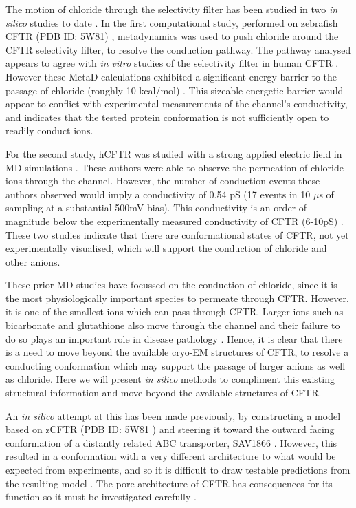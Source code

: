 The motion of chloride through the selectivity filter has been studied in two \textit{in silico} studies to date \cite{farkas2020, zeng2021}. In the first computational study, performed on zebrafish CFTR (PDB ID: 5W81) \cite{zhang2017a}, metadynamics was used to push chloride around the CFTR selectivity filter, to resolve the conduction pathway. The pathway analysed appears to agree with \textit{in vitro} studies of the selectivity filter in human CFTR \cite{linsdell2016}. However these MetaD calculations exhibited a significant energy barrier to the passage of chloride (roughly 10 kcal/mol) \cite{farkas2020}. This sizeable energetic barrier would appear to conflict with experimental measurements of the channel's conductivity, and indicates that the tested protein conformation is not sufficiently open to readily conduct ions. 

For the second study, hCFTR was studied with a strong applied electric field in MD simulations \cite{zeng2021}. These authors were able to observe the permeation of chloride ions through the channel. However, the number of conduction events these authors observed would imply a conductivity of 0.54 pS (17 events in 10 $\mu$s of sampling at a substantial 500mV bias). This conductivity is an order of magnitude below the experimentally measured conductivity of CFTR (6-10pS) \cite{gong2004, lee2007, linsdell2001, sheppard1999}. These two studies indicate that there are conformational states of CFTR, not yet experimentally visualised, which will support the conduction of chloride and other anions. 

These prior MD studies have focussed on the conduction of chloride, since it is the most physiologically important species to permeate through CFTR. However, it is one of the smallest ions which can pass through CFTR. Larger ions such as bicarbonate and glutathione also move through the channel and their failure to do so plays an important role in disease pathology \cite{gao1999, kogan2003, linsdell1998, tang2009, larusch2014, jun2016}. Hence, it is clear that there is a need to move beyond the available cryo-EM structures of CFTR, to resolve a conducting conformation which may support the passage of larger anions as well as chloride. Here we will present \textit{in silico} methods to compliment this existing structural information and move beyond the available structures of CFTR. 

An \textit{in silico} attempt at this has been made previously, by constructing a model based on zCFTR (PDB ID: 5W81 \cite{zhang2017a}) and steering it toward the outward facing conformation of a distantly related ABC transporter, SAV1866 \cite{hoffmann2018, dawson2006}. However, this resulted in a conformation with a very different architecture to what would be expected from experiments, and so it is difficult to draw testable predictions from the resulting model \cite{hoffmann2018, linsdell2018}. The pore architecture of CFTR has consequences for its function so it must be investigated carefully \cite{linsdell2016, linsdell2018, cui2008}. 

